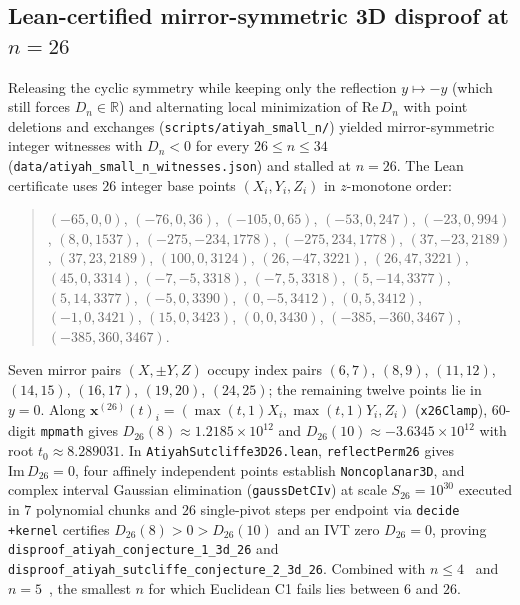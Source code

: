 \documentclass[11pt,reqno]{amsart}
\theoremstyle{remark}
\newcommand{\R}{\mathbb{R}}
\begin{document}
\subsection{Lean-certified mirror-symmetric 3D disproof at $n = 26$}\label{sec:3d26}
Releasing the cyclic symmetry while keeping only the reflection $y \mapsto -y$ (which still forces $D_n \in \R$) and alternating local minimization of $\mathrm{Re}\, D_n$ with point deletions and exchanges (\texttt{scripts/atiyah\_small\_n/}) yielded mirror-symmetric integer witnesses with $D_n < 0$ for every $26 \le n \le 34$ (\texttt{data/atiyah\_small\_n\_witnesses.json}) and stalled at $n = 26$.
The Lean certificate uses $26$ integer base points $(X_i, Y_i, Z_i)$ in $z$-monotone order:
\begin{quote}\small\raggedright
$(-65,0,0)$, $(-76,0,36)$, $(-105,0,65)$, $(-53,0,247)$, $(-23,0,994)$, $(8,0,1537)$, $(-275,-234,1778)$, $(-275,234,1778)$, $(37,-23,2189)$, $(37,23,2189)$, $(100,0,3124)$, $(26,-47,3221)$, $(26,47,3221)$, $(45,0,3314)$, $(-7,-5,3318)$, $(-7,5,3318)$, $(5,-14,3377)$, $(5,14,3377)$, $(-5,0,3390)$, $(0,-5,3412)$, $(0,5,3412)$, $(-1,0,3421)$, $(15,0,3423)$, $(0,0,3430)$, $(-385,-360,3467)$, $(-385,360,3467)$.
\end{quote}
Seven mirror pairs $(X, \pm Y, Z)$ occupy index pairs $(6,7)$, $(8,9)$, $(11,12)$, $(14,15)$, $(16,17)$, $(19,20)$, $(24,25)$; the remaining twelve points lie in $y = 0$.
Along $\mathbf{x}^{(26)}(t)_i = (\max(t,1) X_i, \max(t,1) Y_i, Z_i)$ (\texttt{x26Clamp}), $60$-digit \texttt{mpmath} gives $D_{26}(8) \approx 1.2185 \times 10^{12}$ and $D_{26}(10) \approx -3.6345 \times 10^{12}$ with root $t_0 \approx 8.289031$.
In \texttt{AtiyahSutcliffe3D26.lean}, \texttt{reflectPerm26} gives $\mathrm{Im}\, D_{26} = 0$, four affinely independent points establish \texttt{Noncoplanar3D}, and complex interval Gaussian elimination (\texttt{gaussDetCIv}) at scale $S_{26} = 10^{30}$ executed in $7$ polynomial chunks and $26$ single-pivot steps per endpoint via \texttt{decide +kernel} certifies $D_{26}(8) > 0 > D_{26}(10)$ and an IVT zero $D_{26} = 0$, proving \texttt{disproof\_atiyah\_conjecture\_1\_3d\_26} and \texttt{disproof\_atiyah\_sutcliffe\_conjecture\_2\_3d\_26}.
Combined with $n \le 4$~\cite{EastwoodNorbury2001} and $n = 5$~\cite{TanZhang2026}, the smallest $n$ for which Euclidean C1 fails lies between $6$ and $26$.
\end{document}
